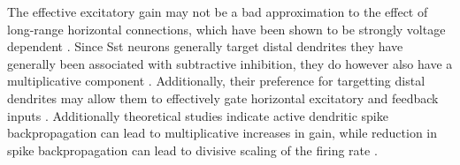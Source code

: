 The effective excitatory gain may not be a bad approximation to the
effect of long-range horizontal connections, which have been shown to
be strongly voltage dependent \citep{Hirsch1991}. Since Sst neurons
generally target distal dendrites they have generally been associated
with subtractive inhibition, they do however also have a
multiplicative component \citep{Wilson2012}. Additionally, their
preference for targetting distal dendrites may allow them to
effectively gate horizontal excitatory and feedback inputs
\citep{Ma2011, Gentet2012}. Additionally theoretical studies indicate
active dendritic spike backpropagation can lead to multiplicative
increases in gain, while reduction in spike backpropagation can lead
to divisive scaling of the firing rate \citep{Mehaffey2005}.
